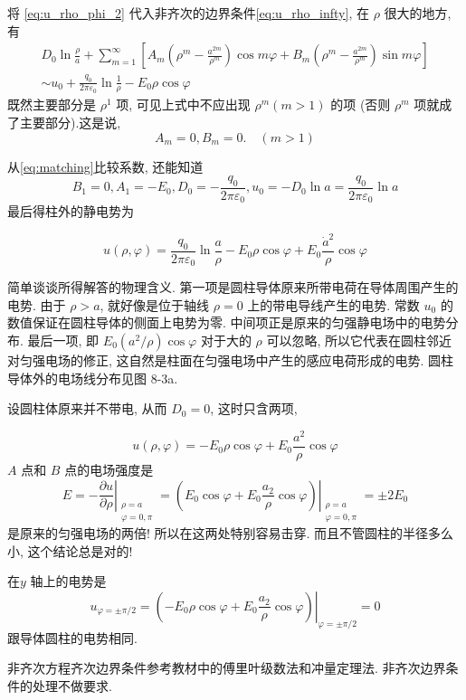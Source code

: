 将 \eqref{eq:u_rho_phi_2} 代入非齐次的边界条件\eqref{eq:u_rho_infty}, 在 $\rho$ 很大的地方, 有
\begin{equation}
    \begin{gathered}
        D_{0} \ln \frac{\rho}{a}+\sum_{m=1}^{\infty}\left[A_{m}\left(\rho^{m}-\frac{a^{2 m}}{\rho^{m}}\right) \cos m \varphi+B_{m}\left(\rho^{m}-\frac{a^{2 m}}{\rho^{m}}\right) \sin m \varphi\right] \\
        \sim u_{0}+\frac{q_{0}}{2 \pi \varepsilon_{0}} \ln \frac{1}{\rho}-E_{0} \rho \cos \varphi
    \end{gathered}
    \label{eq:matching}
\end{equation}
既然主要部分是 $\rho^{1}$ 项, 可见上式中不应出现 $\rho^{m}(m>1)$ 的项 (否则 $\rho^{m}$ 项就成了主要部分).这是说,
$$
A_{m}=0, B_{m}=0 . \quad(m>1)
$$

从\eqref{eq:matching}比较系数, 还能知道
$$
B_{1}=0, A_{1}=-E_{0}, D_{0}=-\frac{q_{0}}{2 \pi \varepsilon_{0}}, 
u_{0}=-D_{0} \ln a=\frac{q_{0}}{2 \pi \varepsilon_{0}} \ln a
$$
最后得柱外的静电势为

$$
u(\rho, \varphi)=\frac{q_{0}}{2 \pi \varepsilon_{0}} \ln \frac{a}{\rho}-E_{0} \rho \cos \varphi+E_{0} \frac{\dot{a}^{2}}{\rho} \cos \varphi
$$

简单谈谈所得解答的物理含义. 
第一项是圆柱导体原来所带电荷在导体周围产生的电势. 
由于 $\rho>a$, 就好像是位于轴线 $\rho=0$ 上的带电导线产生的电势. 
常数 $u_{0}$ 的数值保证在圆柱导体的侧面上电势为零. 中间项正是原来的匀强静电场中的电势分布. 
最后一项, 即 $E_{0}\left(a^{2} / \rho\right) \cos \varphi$ 对于大的 $\rho$ 可以忽略,
所以它代表在圆柱邻近对匀强电场的修正, 这自然是柱面在匀强电场中产生的感应电荷形成的电势. 圆柱导体外的电场线分布见图 8-3a.

设圆柱体原来并不带电, 从而 $D_{0}=0$, 这时只含两项,

$$
u(\rho, \varphi)=-E_{0} \rho \cos \varphi+E_{0} \frac{a^{2}}{\rho} \cos \varphi
$$
$A$ 点和 $B$ 点的电场强度是
$$
E=-\left.\frac{\partial u}{\partial \rho}\right|_{\substack{\rho=a \\ \varphi=0, \pi}}
=\left.\left(E_{0} \cos \varphi+E_{0} \frac{a_{2}}{\rho} \cos \varphi\right)\right|_{\substack{\rho=a \\ \varphi=0, \pi}}
= \pm 2 E_{0}
$$
是原来的匀强电场的两倍! 所以在这两处特别容易击穿. 而且不管圆柱的半径多么小, 这个结论总是对的!

在$y$ 轴上的电势是
$$
u_{\varphi= \pm \pi / 2}=\left.\left(-E_{0} \rho \cos \varphi+E_{0} \frac{a_{2}}{\rho} \cos \varphi\right)\right|_{\varphi= \pm \pi / 2}=0
$$
跟导体圆柱的电势相同. 

非齐次方程齐次边界条件参考教材中的傅里叶级数法和冲量定理法. 非齐次边界条件的处理不做要求.
